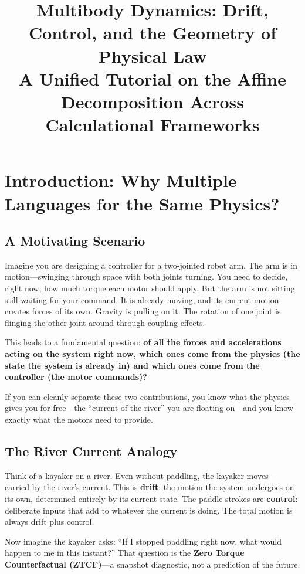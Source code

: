 \documentclass[11pt]{article}
\title{Multibody Dynamics: Drift, Control, and the Geometry of Physical Law\\[0.5em]
\large A Unified Tutorial on the Affine Decomposition Across Calculational Frameworks}
\author{}
\date{}
\begin{document}
\maketitle
\tableofcontents
\newpage

\section{Introduction: Why Multiple Languages for the Same Physics?}\label{sec:introduction}

\subsection{A Motivating Scenario}

Imagine you are designing a controller for a two-jointed robot arm. The arm is in motion---swinging through space with both joints turning. You need to decide, right now, how much torque each motor should apply. But the arm is not sitting still waiting for your command. It is already moving, and its current motion creates forces of its own. Gravity is pulling on it. The rotation of one joint is flinging the other joint around through coupling effects.

This leads to a fundamental question: \textbf{of all the forces and accelerations acting on the system right now, which ones come from the physics (the state the system is already in) and which ones come from the controller (the motor commands)?}

If you can cleanly separate these two contributions, you know what the physics gives you for free---the ``current of the river'' you are floating on---and you know exactly what the motors need to provide.

\subsection{The River Current Analogy}

Think of a kayaker on a river. Even without paddling, the kayaker moves---carried by the river's current. This is \textbf{drift}: the motion the system undergoes on its own, determined entirely by its current state. The paddle strokes are \textbf{control}: deliberate inputs that add to whatever the current is doing. The total motion is always drift plus control.

Now imagine the kayaker asks: ``If I stopped paddling right now, what would happen to me in this instant?'' That question is the \textbf{Zero Torque Counterfactual (ZTCF)}---a snapshot diagnostic, not a prediction of the future.
\end{document}
